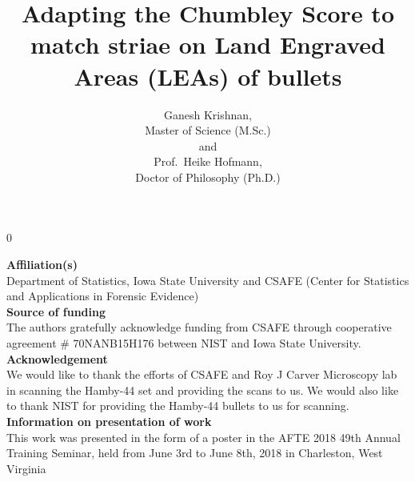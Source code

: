 \documentclass[12pt]{article}
\newcommand{\blind}{0}
\begin{document}
\def\spacingset#1{\renewcommand{\baselinestretch}%
{#1}\small\normalsize} \spacingset{1}



\blind
{
  \title{\bf Adapting the Chumbley Score to match striae on Land Engraved Areas (LEAs) of bullets}

  \author{
        Ganesh Krishnan,\\ %
    Master of Science (M.Sc.)\\
     and \\     Prof.~Heike Hofmann,\\ %
    Doctor of Philosophy (Ph.D.)\\
      }
    \maketitle
  \bigskip
  \begin{center}
  {\textbf{Affiliation(s)}\\
  Department of Statistics, Iowa State University and CSAFE (Center for
  Statistics and Applications in Forensic Evidence)\\
  \bigskip
  \textbf{Source of funding}\\
  The authors gratefully acknowledge funding from CSAFE through
  cooperative agreement \# 70NANB15H176 between NIST and Iowa State
  University.\\
  \bigskip
  \textbf{Acknowledgement}\\
  We would like to thank the efforts of CSAFE and Roy J Carver Microscopy
  lab in scanning the Hamby-44 set and providing the scans to us. We would
  also like to thank NIST for providing the Hamby-44 bullets to us for
  scanning.\\
  \bigskip
  \textbf{Information on presentation of work}\\
  This work was presented in the form of a poster in the AFTE 2018 49th
  Annual Training Seminar, held from June 3rd to June 8th, 2018 in
  Charleston, West Virginia}
  \end{center}

} \fi
\end{document}
